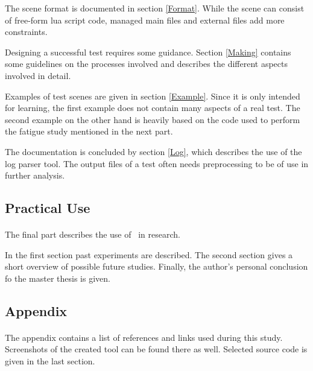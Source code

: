 The scene format is documented in section \ref{Format}.
While the scene can consist of free-form lua script code, managed main files and external files add more constraints.

Designing a successful test requires some guidance.
Section \ref{Making} contains some guidelines on the processes involved and describes the different aspects involved in detail.

Examples of test scenes are given in section \ref{Example}.
Since it is only intended for learning, the first example does not contain many aspects of a real test.
The second example on the other hand is heavily based on the code used to perform the fatigue study mentioned in the next part.

The documentation is concluded by section \ref{Log}, which describes the use of the log parser tool.
The output files of a test often needs preprocessing to be of use in further analysis.


\subsection{Practical Use}
\paragraph{}
The final part describes the use of \ER\ in research.

In the first section past experiments are described.
The second section gives a short overview of possible future studies.
Finally, the author's personal conclusion fo the master thesis is given.

\subsection{Appendix}
\paragraph{}
The appendix contains a list of references and links used during this study.
Screenshots of the created tool can be found there as well.
Selected source code is given in the last section.

